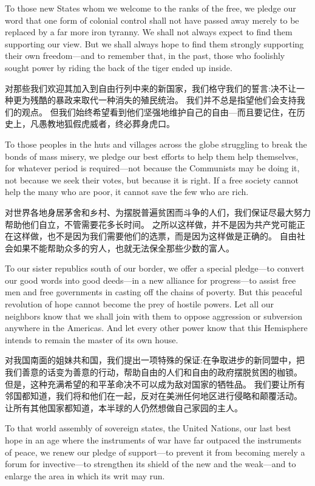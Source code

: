 \documentclass[cs4size, a4paper, 12pt]{article}
\newcounter{numpar}
\newcommand*{\newpar}{\numpar{}}
\begin{document}
	\newpar To those new States whom we welcome to the ranks of the free, we pledge our word that one form of colonial control shall not have passed away merely to be replaced by a far more iron tyranny. We shall not always expect to find them supporting our view. But we shall always hope to find them strongly supporting their own freedom—and to remember that, in the past, those who foolishly sought power by riding the back of the tiger ended up inside.
	
	对那些我们欢迎其加入到自由行列中来的新国家，我们格守我们的誓言:决不让一种更为残酷的暴政来取代一种消失的殖民统治。 我们并不总是指望他们会支持我们的观点。 但我们始终希望看到他们坚强地维护自己的自由—而且要记住，在历史上，凡愚教地狐假虎威者，终必葬身虎口。 
	
	\newpar To those peoples in the huts and villages across the globe struggling to break the bonds of mass misery, we pledge our best efforts to help them help themselves, for whatever period is required—not because the Communists may be doing it, not because we seek their votes, but because it is right. If a free society cannot help the many who are poor, it cannot save the few who are rich.
	
	对世界各地身居茅舍和乡村、为摆脱普遍贫困而斗争的人们，我们保证尽最大努力帮助他们自立，不管需要花多长时间。 之所以这样做，并不是因为共产党可能正在这样做，也不是因为我们需要他们的选票，而是因为这样做是正确的。 自由社会如果不能帮助众多的穷人，也就无法保全那些少数的富人。 
	
	\newpar To our sister republics south of our border, we offer a special pledge—to convert our good words into good deeds—in a new alliance for progress—to assist free men and free governments in casting off the chains of poverty. But this peaceful revolution of hope cannot become the prey of hostile powers. Let all our neighbors know that we shall join with them to oppose aggression or subversion anywhere in the Americas. And let every other power know that this Hemisphere intends to remain the master of its own house.
	
	对我国南面的姐妹共和国，我们提出一项特殊的保证:在争取进步的新同盟中，把我们善意的话变为善意的行动，帮助自由的人们和自由的政府摆脱贫困的枷锁。 但是，这种充满希望的和平革命决不可以成为敌对国家的牺牲品。 我们要让所有邻国都知道，我们将和他们在一起，反对在美洲任何地区进行侵略和颠覆活动。 让所有其他国家都知道，本半球的人仍然想做自己家园的主人。 
	
	\newpar To that world assembly of sovereign states, the United Nations, our last best hope in an age where the instruments of war have far outpaced the instruments of peace, we renew our pledge of support—to prevent it from becoming merely a forum for invective—to strengthen its shield of the new and the weak—and to enlarge the area in which its writ may run.
	
\end{document}
